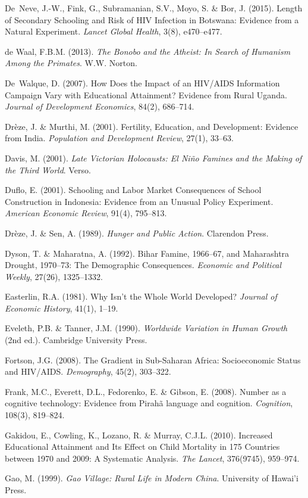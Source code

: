 \documentclass[12pt,letterpaper]{article}
\begin{document}
De~Neve, J.-W., Fink, G., Subramanian, S.V., Moyo, S. \& Bor, J.
(2015). Length of Secondary Schooling and Risk of HIV Infection in
Botswana: Evidence from a Natural Experiment. \emph{Lancet Global
Health}, 3(8), e470--e477.

de Waal, F.B.M. (2013). \emph{The Bonobo and the Atheist: In Search
of Humanism Among the Primates}. W.W. Norton.

De~Walque, D. (2007). How Does the Impact of an HIV/AIDS Information
Campaign Vary with Educational Attainment? Evidence from Rural Uganda.
\emph{Journal of Development Economics}, 84(2), 686--714.

Drèze, J. \& Murthi, M. (2001). Fertility, Education, and Development:
Evidence from India. \emph{Population and Development Review}, 27(1),
33--63.

Davis, M. (2001). \emph{Late Victorian Holocausts: El Niño Famines and
the Making of the Third World}. Verso.

Duflo, E. (2001). Schooling and Labor Market Consequences of School
Construction in Indonesia: Evidence from an Unusual Policy Experiment.
\emph{American Economic Review}, 91(4), 795--813.

Drèze, J. \& Sen, A. (1989). \emph{Hunger and Public Action}. Clarendon
Press.

Dyson, T. \& Maharatna, A. (1992). Bihar Famine, 1966--67, and
Maharashtra Drought, 1970--73: The Demographic Consequences.
\emph{Economic and Political Weekly}, 27(26), 1325--1332.

Easterlin, R.A. (1981). Why Isn't the Whole World Developed?
\emph{Journal of Economic History}, 41(1), 1--19.

Eveleth, P.B. \& Tanner, J.M. (1990). \emph{Worldwide Variation in
Human Growth} (2nd ed.). Cambridge University Press.

Fortson, J.G. (2008). The Gradient in Sub-Saharan Africa: Socioeconomic
Status and HIV/AIDS. \emph{Demography}, 45(2), 303--322.

Frank, M.C., Everett, D.L., Fedorenko, E. \& Gibson, E. (2008). Number
as a cognitive technology: Evidence from Pirahã language and cognition.
\emph{Cognition}, 108(3), 819--824.

Gakidou, E., Cowling, K., Lozano, R. \& Murray, C.J.L. (2010).
Increased Educational Attainment and Its Effect on Child Mortality in
175 Countries between 1970 and 2009: A Systematic Analysis.
\emph{The Lancet}, 376(9745), 959--974.

Gao, M. (1999). \emph{Gao Village: Rural Life in Modern China}.
University of Hawai'i Press.
\end{document}
